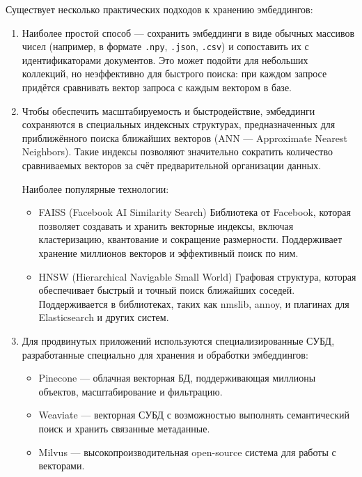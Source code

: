 \documentclass[coursework]{SCWorks}
\begin{document}
Существует несколько практических подходов к хранению эмбеддингов:
\begin{enumerate}
    \item
Наиболее простой способ — сохранить эмбеддинги в виде обычных массивов чисел (например, в формате \verb|.npy|, \verb|.json|, \verb|.csv|) и сопоставить их с идентификаторами документов. Это может подойти для небольших коллекций, но неэффективно для быстрого поиска: при каждом запросе придётся сравнивать вектор запроса с каждым вектором в базе.

    \item Чтобы обеспечить масштабируемость и быстродействие, эмбеддинги сохраняются в специальных индексных структурах, предназначенных для приближённого поиска ближайших векторов (ANN — Approximate Nearest Neighbors). Такие индексы позволяют значительно сократить количество сравниваемых векторов за счёт предварительной организации данных.

Наиболее популярные технологии:
\begin{itemize}
    \item 
    FAISS (Facebook AI Similarity Search)
    Библиотека от Facebook, которая позволяет создавать и хранить векторные индексы, включая кластеризацию, квантование и сокращение размерности. Поддерживает хранение миллионов векторов и эффективный поиск по ним.

    \item HNSW (Hierarchical Navigable Small World)
    Графовая структура, которая обеспечивает быстрый и точный поиск ближайших соседей. Поддерживается в библиотеках, таких как nmslib, annoy, и плагинах для Elasticsearch и других систем.
\end{itemize}

    \item Для продвинутых приложений используются специализированные СУБД, разработанные специально для хранения и обработки эмбеддингов:
    \begin{itemize}
        \item 
        Pinecone — облачная векторная БД, поддерживающая миллионы объектов, масштабирование и фильтрацию.

        \item Weaviate — векторная СУБД с возможностью выполнять семантический поиск и хранить связанные метаданные.

        \item Milvus — высокопроизводительная open-source система для работы с векторами.
        \end{itemize}
\end{enumerate}
\end{document}
